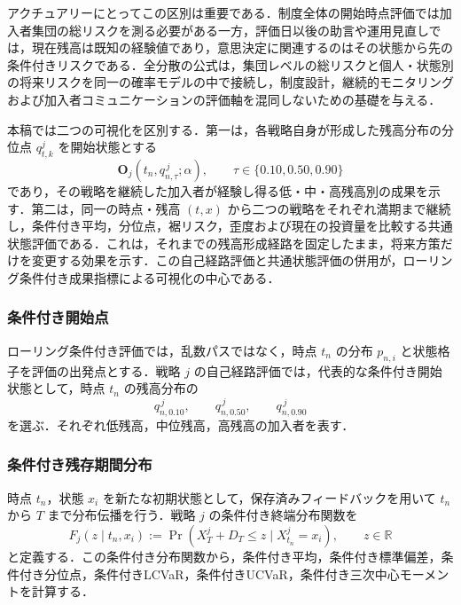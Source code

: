 \documentclass[10pt,a4paper]{article}
\theoremstyle{plain}
\theoremstyle{definition}
\newcommand{\R}{\mathbb{R}}
\begin{document}
アクチュアリーにとってこの区別は重要である．制度全体の開始時点評価では加入者集団の総リスクを測る必要がある一方，評価日以後の助言や運用見直しでは，現在残高は既知の経験値であり，意思決定に関連するのはその状態から先の条件付きリスクである．全分散の公式は，集団レベルの総リスクと個人・状態別の将来リスクを同一の確率モデルの中で接続し，制度設計，継続的モニタリングおよび加入者コミュニケーションの評価軸を混同しないための基礎を与える．

本稿では二つの可視化を区別する．第一は，各戦略自身が形成した残高分布の分位点 $q_{t,k}^{j}$ を開始状態とする
\begin{equation}
  \mathbf O_j\!\left(t_n,q_{n,\tau}^{\,j};\alpha\right),
  \qquad \tau\in\{0.10,0.50,0.90\}
  \label{eq:self-path-rolling-profile}
\end{equation}
であり，その戦略を継続した加入者が経験し得る低・中・高残高別の成果を示す．第二は，同一の時点・残高 $(t,x)$ から二つの戦略をそれぞれ満期まで継続し，条件付き平均，分位点，裾リスク，歪度および現在の投資量を比較する共通状態評価である．これは，それまでの残高形成経路を固定したまま，将来方策だけを変更する効果を示す．この自己経路評価と共通状態評価の併用が，ローリング条件付き成果指標による可視化の中心である．

\subsubsection{条件付き開始点}

ローリング条件付き評価では，乱数パスではなく，時点 $t_n$ の分布 $p_{n,i}$ と状態格子を評価の出発点とする．戦略 $j$ の自己経路評価では，代表的な条件付き開始状態として，時点 $t_n$ の残高分布の
\begin{equation}
  q_{n,0.10}^{\,j},\qquad q_{n,0.50}^{\,j},\qquad q_{n,0.90}^{\,j}
  \label{eq:rolling-quantiles}
\end{equation}
を選ぶ．それぞれ低残高，中位残高，高残高の加入者を表す．

\subsubsection{条件付き残存期間分布}

時点 $t_n$，状態 $x_i$ を新たな初期状態として，保存済みフィードバックを用いて $t_n$ から $T$ まで分布伝播を行う．戦略 $j$ の条件付き終端分布関数を
\begin{equation}
  F_j(z\mid t_n,x_i)
  :=\Pr\!\left(X_T^j+D_T\leq z\mid X_{t_n}^j=x_i\right),
  \qquad z\in\R
  \label{eq:conditional-terminal-law}
\end{equation}
と定義する．この条件付き分布関数から，条件付き平均，条件付き標準偏差，条件付き分位点，条件付きLCVaR，条件付きUCVaR，条件付き三次中心モーメントを計算する．
\end{document}
